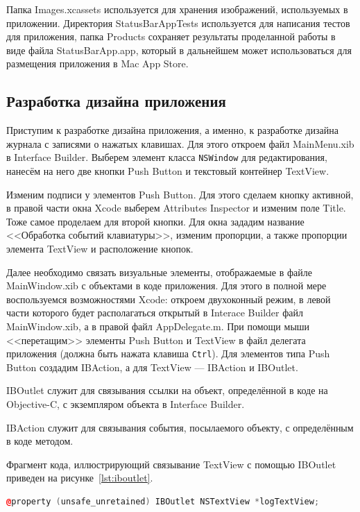 Папка Images.xcassets используется для хранения изображений, используемых
в приложении. Директория StatusBarAppTests используется для написания тестов
для приложения, папка Products сохраняет результаты проделанной работы в виде
файла StatusBarApp.app, который в дальнейшем может использоваться для
размещения приложения в Mac App Store.


\subsection{Разработка дизайна приложения}

Приступим к разработке дизайна приложения, а именно, к разработке дизайна журнала
с записями о нажатых клавишах. Для этого откроем файл MainMenu.xib
в Interface Builder. Выберем элемент класса \texttt{NSWindow} для редактирования,
нанесём на него две кнопки Push Button и текстовый контейнер TextView.

Изменим подписи у элементов Push Button. Для этого сделаем кнопку
активной, в правой части окна Xcode выберем Attributes Inspector и изменим
поле Title. Тоже самое проделаем для второй кнопки. Для окна зададим название
<<Обработка событий клавиатуры>>, изменим пропорции, а также пропорции
элемента TextView и расположение кнопок.

Далее необходимо связать визуальные элементы, отображаемые в файле MainWindow.xib
с объектами в коде приложения. Для этого в полной мере воспользуемся возможностями
Xcode: откроем двухоконный режим, в левой части которого будет располагаться
открытый в Interace Builder файл MainWindow.xib, а в правой файл AppDelegate.m.
При помощи мыши <<перетащим>> элементы Push Button и TextView в файл делегата
приложения (должна быть нажата клавиша \texttt{Ctrl}). Для элементов типа Push Button
создадим IBAction, а для TextView --- IBAction и IBOutlet.

IBOutlet служит для связывания ссылки на объект, определённой в коде на Objective-C,
с экземпляром объекта в Interface Builder.

IBAction служит для связывания события, посылаемого объекту, с определённым
в коде методом.

Фрагмент кода, иллюстрирующий связывание TextView с помощью IBOutlet приведен
на рисунке~\ref{lst:iboutlet}.
\begin{lstlisting}[basicstyle=\scriptsize\ttfamily,
                   numberstyle=\scriptsize\ttfamily,
                   xleftmargin=7mm,
                   language=C++,caption=Связывание TextView с помощью IBOutlet,
                   label=lst:iboutlet]
@property (unsafe_unretained) IBOutlet NSTextView *logTextView;
\end{lstlisting}

